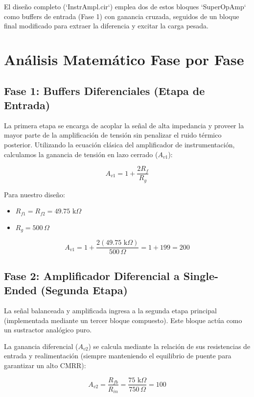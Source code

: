 \documentclass[11pt, a4paper]{article}
\begin{document}
El diseño completo (`InstrAmpl.cir`) emplea dos de estos bloques `SuperOpAmp` como buffers de entrada (Fase 1) con ganancia cruzada, seguidos de un bloque final modificado para extraer la diferencia y excitar la carga pesada.

\newpage
\section{Análisis Matemático Fase por Fase}

\subsection{Fase 1: Buffers Diferenciales (Etapa de Entrada)}

La primera etapa se encarga de acoplar la señal de alta impedancia y proveer la mayor parte de la amplificación de tensión sin penalizar el ruido térmico posterior.
Utilizando la ecuación clásica del amplificador de instrumentación, calculamos la ganancia de tensión en lazo cerrado ($A_{v1}$):

\begin{equation}
A_{v1} = 1 + \frac{2 R_f}{R_g}
\end{equation}

Para nuestro diseño:
\begin{itemize}
    \item $R_{f1} = R_{f2} = 49.75\text{ k}\Omega$
    \item $R_g = 500\,\Omega$
\end{itemize}

\begin{equation}
A_{v1} = 1 + \frac{2(49.75\text{ k}\Omega)}{500\,\Omega} = 1 + 199 = 200
\end{equation}

\subsection{Fase 2: Amplificador Diferencial a Single-Ended (Segunda Etapa)}

La señal balanceada y amplificada ingresa a la segunda etapa principal (implementada mediante un tercer bloque compuesto). Este bloque actúa como un sustractor analógico puro.

La ganancia diferencial ($A_{v2}$) se calcula mediante la relación de sus resistencias de entrada y realimentación (siempre manteniendo el equilibrio de puente para garantizar un alto CMRR):

\begin{equation}
A_{v2} = \frac{R_{fb}}{R_{in}} = \frac{75\text{ k}\Omega}{750\,\Omega} = 100
\end{equation}
\end{document}
